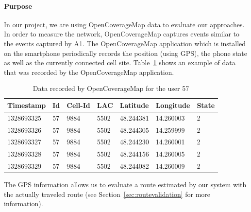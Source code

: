 \documentclass[master,english]{hgbthesis}
\begin{document}
\paragraph{Purpose}
In our project, we are using OpenCoverageMap data to evaluate our approaches. In order to measure the network, OpenCoverageMap captures events similar to the events captured by A1.
The OpenCoverageMap application which is installed on the smartphone periodically records the position (using GPS), the phone state as well as the currently connected cell site. Table~\ref{tab:ocmrecord} shows an example of data that was recorded by the OpenCoverageMap application.
\begin{table}[ht]
	\begin{tabular}{|l|l|l|l|l|l|l|}  \hline
		\textbf{Timestamp} & \textbf{Id} & \textbf{Cell-Id} & \textbf{LAC} & \textbf{Latitude} & \textbf{Longitude} & \textbf{State} \\    \hline 1328693325 & 57         & 9884   & 5502 & 48.244381 & 14.260003 & 2 \\  \hline
		1328693326 & 57         & 9884   & 5502 & 48.244305& 14.259999 & 2\\  \hline
		1328693327 & 57         & 9884   & 5502 & 48.244230 & 14.260001 & 2\\  \hline
		1328693328 & 57         & 9884   & 5502 & 48.244156 & 14.260005 & 2\\  \hline
		1328693329 & 57         & 9884   & 5502 & 48.244082 & 14.260009 & 2\\  \hline
	\end{tabular}
	\caption{Data recorded by OpenCoverageMap for the user 57}
	\label{tab:ocmrecord}
\end{table}
The GPS information allows us to evaluate a route estimated by our system with the actually traveled route (see Section~\ref{sec:routevalidation} for more information).
\end{document}
